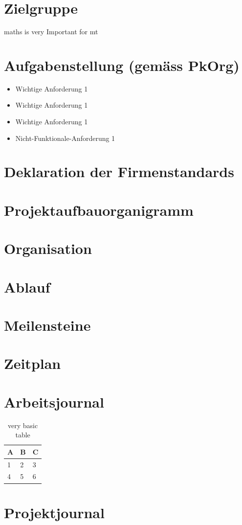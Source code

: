 \documentclass{article}
\begin{document}
\section{Zielgruppe}
\Gls{maths} is very Important for \acrfull{mt}
\section{Aufgabenstellung (gemäss PkOrg)}
\begin{itemize}
    \item{Wichtige Anforderung 1}
    \item{Wichtige Anforderung 1}
    \item{Wichtige Anforderung 1}
    \item{Nicht-Funktionale-Anforderung 1}
\end{itemize}
\section{Deklaration der Firmenstandards}
\section{Projektaufbauorganigramm}
\section{Organisation}
\section{Ablauf}
\section{Meilensteine}
\section{Zeitplan}
\section{Arbeitsjournal}
\begin{table}[h]
    \centering
    \begin{tabular}{l | l | l}
    A & B & C \\
    \hline
    1 & 2 & 3 \\
    4 & 5 & 6
    \end{tabular}
    \caption{very basic table}
    \label{tab:abc}
    \end{table}
\section{Projektjournal}
\end{document}
